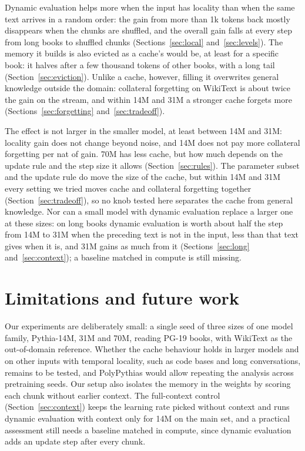 \documentclass[10pt]{article}
\begin{document}
Dynamic evaluation helps more when the input has locality than when the same text arrives in a random order: the gain from more than 1k tokens back mostly disappears when the chunks are shuffled, and the overall gain falls at every step from long books to shuffled chunks (Sections~\ref{sec:local} and~\ref{sec:levels}).
The memory it builds is also evicted as a cache's would be, at least for a specific book: it halves after a few thousand tokens of other books, with a long tail (Section~\ref{sec:eviction}).
Unlike a cache, however, filling it overwrites general knowledge outside the domain: collateral forgetting on WikiText is about twice the gain on the stream, and within 14M and 31M a stronger cache forgets more (Sections~\ref{sec:forgetting} and~\ref{sec:tradeoff}).

The effect is not larger in the smaller model, at least between 14M and 31M: locality gain does not change beyond noise, and 14M does not pay more collateral forgetting per nat of gain.
70M has less cache, but how much depends on the update rule and the step size it allows (Section~\ref{sec:rules}).
The parameter subset and the update rule do move the size of the cache, but within 14M and 31M every setting we tried moves cache and collateral forgetting together (Section~\ref{sec:tradeoff}), so no knob tested here separates the cache from general knowledge.
Nor can a small model with dynamic evaluation replace a larger one at these sizes: on long books dynamic evaluation is worth about half the step from 14M to 31M when the preceding text is not in the input, less than that text gives when it is, and 31M gains as much from it (Sections~\ref{sec:long} and~\ref{sec:context}); a baseline matched in compute is still missing.

\section{Limitations and future work}\label{sec:future}

Our experiments are deliberately small: a single seed of three sizes of one model family, Pythia-14M, 31M and 70M, reading PG-19 books, with WikiText as the out-of-domain reference.
Whether the cache behaviour holds in larger models and on other inputs with temporal locality, such as code bases and long conversations, remains to be tested, and PolyPythias \cite{vanderwal2025polypythias} would allow repeating the analysis across pretraining seeds.
Our setup also isolates the memory in the weights by scoring each chunk without earlier context.
The full-context control (Section~\ref{sec:context}) keeps the learning rate picked without context and runs dynamic evaluation with context only for 14M on the main set, and a practical assessment still needs a baseline matched in compute, since dynamic evaluation adds an update step after every chunk.
\end{document}
